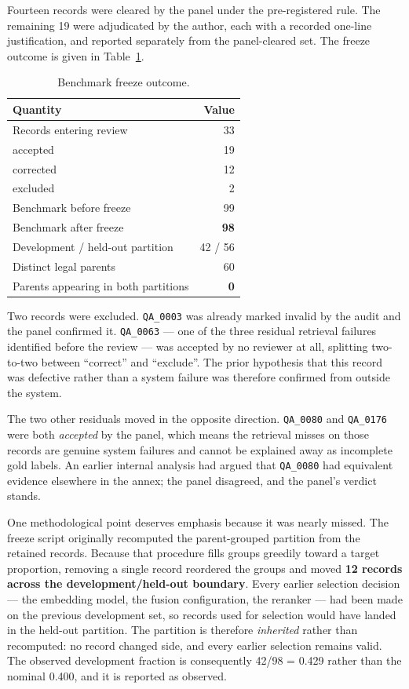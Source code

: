 Fourteen records were cleared by the panel under the pre-registered rule. The
remaining 19 were adjudicated by the author, each with a recorded one-line
justification, and reported separately from the panel-cleared set. The freeze
outcome is given in Table~\ref{tab:freeze}.

\begin{table}[htbp]
  \centering
  \caption{Benchmark freeze outcome.}
  \label{tab:freeze}
  \begin{tabular}{lr}
    \toprule
    \textbf{Quantity} & \textbf{Value} \\
    \midrule
    Records entering review & 33 \\
    \quad accepted & 19 \\
    \quad corrected & 12 \\
    \quad excluded & 2 \\
    \midrule
    Benchmark before freeze & 99 \\
    Benchmark after freeze & \textbf{98} \\
    Development / held-out partition & 42 / 56 \\
    Distinct legal parents & 60 \\
    Parents appearing in both partitions & \textbf{0} \\
    \bottomrule
  \end{tabular}
\end{table}

Two records were excluded. \texttt{QA\_0003} was already marked invalid by the
audit and the panel confirmed it. \texttt{QA\_0063} --- one of the three residual
retrieval failures identified before the review --- was accepted by no reviewer at
all, splitting two-to-two between \enquote{correct} and \enquote{exclude}. The
prior hypothesis that this record was defective rather than a system failure was
therefore confirmed from outside the system.

The two other residuals moved in the opposite direction. \texttt{QA\_0080} and
\texttt{QA\_0176} were both \emph{accepted} by the panel, which means the
retrieval misses on those records are genuine system failures and cannot be
explained away as incomplete gold labels. An earlier internal analysis had argued
that \texttt{QA\_0080} had equivalent evidence elsewhere in the annex; the panel
disagreed, and the panel's verdict stands.

One methodological point deserves emphasis because it was nearly missed. The
freeze script originally recomputed the parent-grouped partition from the
retained records. Because that procedure fills groups greedily toward a target
proportion, removing a single record reordered the groups and moved \textbf{12
records across the development/held-out boundary}. Every earlier selection
decision --- the embedding model, the fusion configuration, the reranker --- had
been made on the previous development set, so records used for selection would
have landed in the held-out partition. The partition is therefore \emph{inherited}
rather than recomputed: no record changed side, and every earlier selection
remains valid. The observed development fraction is consequently 42/98 = 0.429
rather than the nominal 0.400, and it is reported as observed.


